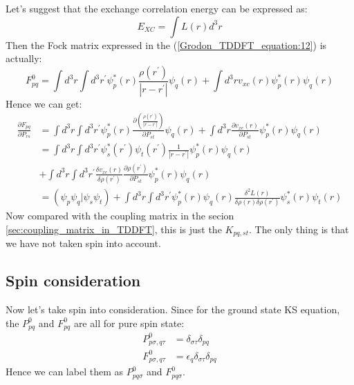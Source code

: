 Let's suggest that the exchange correlation energy can be expressed
as:
\begin{equation}
 E_{XC} = \int L(r) d^{3}r
\end{equation}
Then the Fock matrix expressed in the
(\ref{Grodon_TDDFT_equation:12}) is actually:
\begin{equation}
\label{Grodon_TDDFT_equation:13}
 F^{0}_{pq} = \int d^{3}r\int d^{3}r^{'}\psi^{*}_{p}(r)
\frac{\rho(r^{'})}{|r-r^{'}|}
\psi_{q}(r) + \int d^{3}r
v_{xc}(r)\psi^{*}_{p}(r)\psi_{q}(r)
\end{equation} 
Hence we can get:
\begin{align}
 \label{Grodon_TDDFT_equation:14}
\frac{\partial F_{pq}}{\partial
P_{rs}}
&= \int d^{3}r\int d^{3}r^{'}\psi^{*}_{p}(r)\frac{\partial\left( 
\frac{\rho(r^{'})}{|r-r^{'}|}\right) }{\partial P_{st}}
\psi_{q}(r) + \int d^{3}r
\frac{\partial v_{xc}(r)}{\partial P_{st}}\psi^{*}_{p}(r)\psi_{q}(r)
\nonumber \\
&= \int d^{3}r\int d^{3}r^{'}
\psi^{*}_{s}(r^{'})\psi_{t}(r^{'})
\frac{1}{|r-r^{'}|}
\psi^{*}_{p}(r)\psi_{q}(r) \nonumber \\
&+
\int d^{3}r\int d^{3}r^{'}
\frac{\delta v_{xc}(r)}{\delta \rho(r^{'})}\frac{\partial
\rho(r^{'})}{\partial P_{st}}\psi^{*}_{p}(r)\psi_{q}(r)
\nonumber \\
&= (\psi_{p}\psi_{q}|\psi_{s}\psi_{t}) + \int d^{3}r\int d^{3}r^{'}
\psi^{*}_{p}(r)\psi_{q}(r)
\frac{\delta^{2} L (r)}{\delta \rho(r)\delta
\rho(r^{'})}\psi^{*}_{s}(r)\psi_{t}(r)
\end{align}
Now compared with the coupling matrix in the secion 
\ref{sec:coupling_matrix_in_TDDFT}, this is just the $K_{pq,st}$. The
only thing is that we have not taken spin into account.

\subsection{Spin consideration}
%
%
%
Now let's take spin into consideration. Since for the ground state KS
equation, the $P^{0}_{pq}$ and $F^{0}_{pq}$ are all for pure spin
state:
\begin{align}
  \label{Grodon_TDDFT_equation:15}
P^{0}_{p\sigma,q\tau} &= \delta_{\sigma\tau}\delta_{pq} \nonumber \\
F^{0}_{p\sigma,q\tau} &= \epsilon_{q}\delta_{\sigma\tau}\delta_{pq}
\end{align}
Hence we can label them as $P^{0}_{pq\sigma}$ and $F^{0}_{pq\sigma}$.

